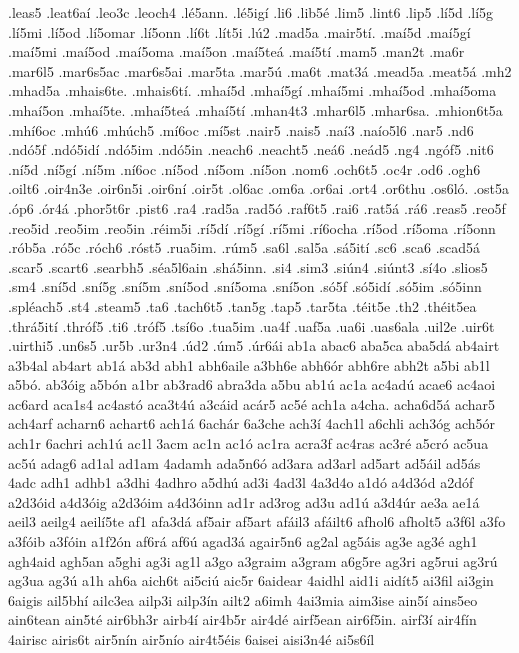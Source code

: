 {.leas5
.leat6aí
.leo3c
.leoch4
.lé5ann.
.lé5igí
.li6
.lib5é
.lim5
.lint6
.lip5
.lí5d
.lí5g
.lí5mi
.lí5od
.lí5omar
.lí5onn
.lí6t
.lít5i
.lú2
.mad5a
.mair5tí.
.maí5d
.maí5gí
.maí5mi
.maí5od
.maí5oma
.maí5on
.maí5teá
.maí5tí
.mam5
.man2t
.ma6r
.mar6l5
.mar6s5ac
.mar6s5ai
.mar5ta
.mar5ú
.ma6t
.mat3á
.mead5a
.meat5á
.mh2
.mhad5a
.mhais6te.
.mhais6tí.
.mhaí5d
.mhaí5gí
.mhaí5mi
.mhaí5od
.mhaí5oma
.mhaí5on
.mhaí5te.
.mhaí5teá
.mhaí5tí
.mhan4t3
.mhar6l5
.mhar6sa.
.mhion6t5a
.mhí6oc
.mhú6
.mhúch5
.mí6oc
.mí5st
.nair5
.nais5
.naí3
.naío5l6
.nar5
.nd6
.ndó5f
.ndó5idí
.ndó5im
.ndó5in
.neach6
.neacht5
.neá6
.neád5
.ng4
.ngóf5
.nit6
.ní5d
.ní5gí
.ní5m
.ní6oc
.ní5od
.ní5om
.ní5on
.nom6
.och6t5
.oc4r
.od6
.ogh6
.oilt6
.oir4n3e
.oir6n5i
.oir6ní
.oir5t
.ol6ac
.om6a
.or6ai
.ort4
.or6thu
.os6ló.
.ost5a
.óp6
.ór4á
.phor5t6r
.pist6
.ra4
.rad5a
.rad5ó
.raf6t5
.rai6
.rat5á
.rá6
.reas5
.reo5f
.reo5id
.reo5im
.reo5in
.réim5i
.rí5dí
.rí5gí
.rí5mi
.rí6ocha
.rí5od
.rí5oma
.rí5onn
.rób5a
.ró5c
.róch6
.róst5
.rua5im.
.rúm5
.sa6l
.sal5a
.sá5ití
.sc6
.sca6
.scad5á
.scar5
.scart6
.searbh5
.séa5l6ain
.shá5inn.
.si4
.sim3
.siún4
.siúnt3
.sí4o
.slios5
.sm4
.sní5d
.sní5g
.sní5m
.sní5od
.sní5oma
.sní5on
.só5f
.só5idí
.só5im
.só5inn
.spléach5
.st4
.steam5
.ta6
.tach6t5
.tan5g
.tap5
.tar5ta
.téit5e
.th2
.théit5ea
.thrá5ití
.thróf5
.ti6
.tróf5
.tsí6o
.tua5im
.ua4f
.uaf5a
.ua6i
.uas6ala
.uil2e
.uir6t
.uirthi5
.un6s5
.ur5b
.ur3n4
.úd2
.úm5
.úr6ái
ab1a
abac6
aba5ca
aba5dá
ab4airt
a3b4al
ab4art
ab1á
ab3d
abh1
abh6aile
a3bh6e
abh6ór
abh6re
abh2t
a5bi
ab1l
a5bó.
ab3óig
a5bón
a1br
ab3rad6
abra3da
a5bu
ab1ú
ac1a
ac4adú
acae6
ac4aoi
ac6ard
aca1s4
ac4astó
aca3t4ú
a3cáid
acár5
ac5é
ach1a
a4cha.
acha6d5á
achar5
ach4arf
acharn6
achart6
ach1á
6achár
6a3che
ach3í
4ach1l
a6chli
ach3óg
ach5ór
ach1r
6achri
ach1ú
ac1l
3acm
ac1n
ac1ó
ac1ra
acra3f
ac4ras
ac3ré
a5cró
ac5ua
ac5ú
adag6
ad1al
ad1am
4adamh
ada5n6ó
ad3ara
ad3arl
ad5art
ad5áil
ad5ás
4adc
adh1
adhb1
a3dhi
4adhro
a5dhú
ad3i
4ad3l
4a3d4o
a1dó
a4d3ód
a2dóf
a2d3óid
a4d3óig
a2d3óim
a4d3óinn
ad1r
ad3rog
ad3u
ad1ú
a3d4úr
ae3a
ae1á
aeil3
aeilg4
aeilí5te
af1
afa3dá
af5air
af5art
afáil3
afáilt6
afhol6
afholt5
a3f6l
a3fo
a3fóib
a3fóin
a1f2ón
af6rá
af6ú
agad3á
agair5n6
ag2al
ag5áis
ag3e
ag3é
agh1
agh4aid
agh5an
a5ghi
ag3i
ag1l
a3go
a3graim
a3gram
a6g5re
ag3ri
ag5rui
ag3rú
ag3ua
ag3ú
a1h
ah6a
aich6t
ai5ciú
aic5r
6aidear
4aidhl
aid1i
aidít5
ai3fil
ai3gin
6aigis
ail5bhí
ailc3ea
ailp3i
ailp3ín
ailt2
a6imh
4ai3mia
aim3ise
ain5í
ains5eo
ain6tean
ain5té
air6bh3r
airb4í
air4b5r
air4dé
airf5ean
air6f5in.
airf3í
air4fín
4airisc
airis6t
air5nín
air5nío
air4t5éis
6aisei
aisi3n4é
ai5s6íl
}
